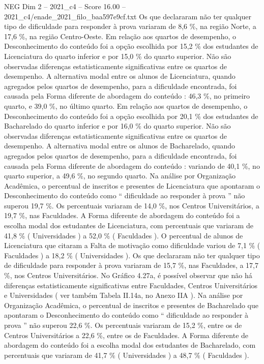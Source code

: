\begin{textsample}{NEG Dim 2 – 2021\_c4 – Score 16.00 – 2021\_c4/enade\_2021\_filo\_baa597e9cf.txt}
Os que declararam não ter qualquer tipo de dificuldade para responder à prova variaram de 8,6 \%, na região Norte, a 17,6 \%, na região Centro-Oeste.
Em relação aos quartos de desempenho, o Desconhecimento do conteúdo foi a opção escolhida por 15,2 \% dos estudantes de Licenciatura do quarto inferior e por 15,0 \% do quarto superior.
Não são observadas diferenças estatisticamente significativas entre os quartos de desempenho.
A alternativa modal entre os alunos de Licenciatura, quando agregados pelos quartos de desempenho, para a dificuldade encontrada, foi causada pela Forma diferente de abordagem do conteúdo : 46,3 \%, no primeiro quarto, e 39,0 \%, no último quarto.
Em relação aos quartos de desempenho, o Desconhecimento do conteúdo foi a opção escolhida por 20,1 \% dos estudantes de Bacharelado do quarto inferior e por 16,0 \% do quarto superior.
Não são observadas diferenças estatisticamente significativas entre os quartos de desempenho.
A alternativa modal entre os alunos de Bacharelado, quando agregados pelos quartos de desempenho, para a dificuldade encontrada, foi causada pela Forma diferente de abordagem do conteúdo : variando de 40,1 \%, no quarto superior, a 49,6 \%, no segundo quarto.
Na análise por Organização Acadêmica, o percentual de inscritos e presentes de Licenciatura que apontaram o Desconhecimento do conteúdo como “ dificuldade ao responder à prova ” não superou 19,7 \%.
Os percentuais variaram de 14,0 \%, nos Centros Universitários, a 19,7 \%, nas Faculdades.
A Forma diferente de abordagem do conteúdo foi a escolha modal dos estudantes de Licenciatura, com percentuais que variaram de 41,8 \% ( Universidades ) a 52,0 \% ( Faculdades ).
O percentual de alunos de Licenciatura que citaram a Falta de motivação como dificuldade variou de 7,1 \% ( Faculdades ) a 18,2 \% ( Universidades ).
Os que declararam não ter qualquer tipo de dificuldade para responder à prova variaram de 15,7 \%, nas Faculdades, a 17,7 \%, nos Centros Universitários.
No Gráfico 4.27a, é possível observar que não há diferenças estatisticamente significativas entre Faculdades, Centros Universitários e Universidades ( ver também Tabela II.14a, no Anexo IIA ).
Na análise por Organização Acadêmica, o percentual de inscritos e presentes de Bacharelado que apontaram o Desconhecimento do conteúdo como “ dificuldade ao responder à prova ” não superou 22,6 \%.
Os percentuais variaram de 15,2 \%, entre os de Centros Universitários a 22,6 \%, entre os de Faculdades.
A Forma diferente de abordagem do conteúdo foi a escolha modal dos estudantes de Bacharelado, com percentuais que variaram de 41,7 \% ( Universidades ) a 48,7 \% ( Faculdades ).

\end{textsample}
